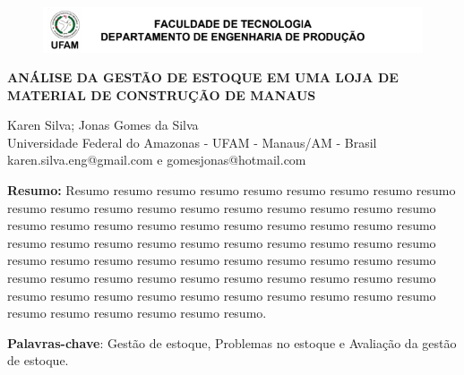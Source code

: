 \documentclass[article,12pt,oneside,a4paper,english,brazil,sumario=tradicional]{abntex2}
\begin{document}
\frenchspacing %

    \begin{center}

    \begin{figure}[!ht]%
    \begin{center}  
    \includegraphics[scale=0.8]{Figuras/LogoTitle4.png}
    \end{center}
    \end{figure}

	{\uppercase{\bfseries{ANÁLISE DA GESTÃO DE ESTOQUE  EM  UMA LOJA DE MATERIAL DE CONSTRUÇÃO DE MANAUS}}
	\vspace{14pt}}
	
	{
	Karen Silva; Jonas Gomes da Silva\\
	Universidade Federal do Amazonas - UFAM - Manaus/AM - Brasil\\
	karen.silva.eng@gmail.com e gomesjonas@hotmail.com
	\vspace{12pt}}

\end{center}



\begin{footnotesize}
\SingleSpacing
\noindent
\small{\textbf{Resumo:}}
\noindent
\small
Resumo resumo resumo resumo resumo resumo resumo resumo resumo resumo resumo resumo resumo resumo resumo resumo resumo resumo resumo resumo resumo resumo resumo resumo resumo resumo resumo resumo resumo resumo resumo resumo resumo resumo resumo resumo resumo resumo resumo resumo resumo resumo resumo resumo resumo resumo resumo resumo resumo resumo resumo resumo resumo resumo resumo resumo resumo resumo resumo resumo resumo resumo resumo resumo resumo resumo resumo resumo resumo resumo resumo resumo resumo resumo resumo.

\noindent
\textbf{Palavras-chave}: Gestão de estoque, Problemas no estoque e Avaliação da gestão de estoque.
\end{footnotesize}

\textual
\pagestyle{simple}






\renewcommand{\bibsection}{\section*{REFER\^ENCIAS BIBLIOGR\'AFICAS}}


\end{document}
